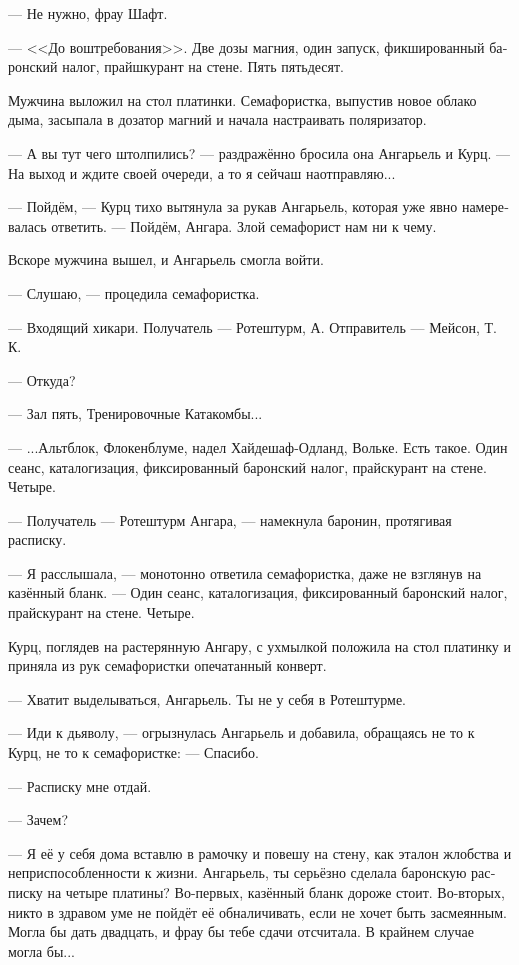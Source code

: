 \documentclass[a4paper,12pt,fleqn]{book}\usepackage{cooltooltips}\usepackage{polyglossia}\setdefaultlanguage[babelshorthands=true]{russian}\setotherlanguage{english}\defaultfontfeatures{Ligatures=TeX,Mapping=tex-text} \usepackage{xcolor}\definecolor{lightgray}{HTML}{bbbbbb}\color{lightgray}\newcommand{\ml}[3]{\textenglish{\textcolor{black}{#3}}}
\begin{document}
--- Не нужно, фрау Шафт.

--- <<До воштребования>>.
Две дозы магния, один запуск, фикшированный баронский налог, прайшкурант на стене.
Пять пятьдесят.

Мужчина выложил на стол платинки.
Семафористка, выпустив новое облако дыма, засыпала в дозатор магний и начала настраивать поляризатор.

--- А вы тут чего штолпились? --- раздражённо бросила она Ангарьель и Курц.
--- На выход и ждите своей очереди, а то я сейчаш наотправляю...

--- Пойдём, --- Курц тихо вытянула за рукав Ангарьель, которая уже явно намеревалась ответить.
--- Пойдём, Ангара.
Злой семафорист нам ни к чему.

Вскоре мужчина вышел, и Ангарьель смогла войти.

--- Слушаю, --- процедила семафористка.

--- Входящий хикари.
Получатель --- Ротештурм, А.
Отправитель --- Мейсон, Т. К.

--- Откуда?

--- Зал пять, Тренировочные Катакомбы...

--- ...Альтблок, Флокенблуме, надел Хайдешаф-Одланд, Вольке.
Есть такое.
Один сеанс, каталогизация, фиксированный баронский налог, прайскурант на стене.
Четыре.

--- Получатель --- Ротештурм Ангара, --- намекнула баронин, протягивая расписку.

--- Я расслышала, --- монотонно ответила семафористка, даже не взглянув на казённый бланк.
--- Один сеанс, каталогизация, фиксированный баронский налог, прайскурант на стене.
Четыре.

Курц, поглядев на растерянную Ангару, с ухмылкой положила на стол платинку и приняла из рук семафористки опечатанный конверт.

--- Хватит выделываться, Ангарьель.
Ты не у себя в Ротештурме.

--- Иди к дьяволу, --- огрызнулась Ангарьель и добавила, обращаясь не то к Курц, не то к семафористке:
--- Спасибо.

--- Расписку мне отдай.

--- Зачем?

--- Я её у себя дома вставлю в рамочку и повешу на стену, как эталон жлобства и неприспособленности к жизни.
Ангарьель, ты серьёзно сделала баронскую расписку на четыре платины?
Во-первых, казённый бланк дороже стоит.
Во-вторых, никто в здравом уме не пойдёт её обналичивать, если не хочет быть засмеянным.
Могла бы дать двадцать, и фрау бы тебе сдачи отсчитала.
В крайнем случае могла бы...
\end{document}
